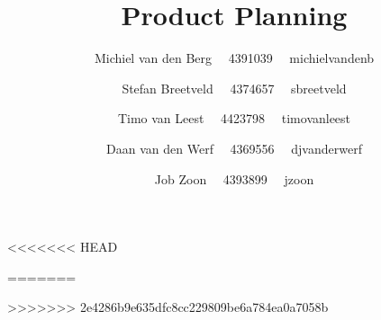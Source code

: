 \documentclass[11pt,a4paper]{article}
\title{Product Planning}
\author{ 	Michiel van den Berg \ \ 4391039 \ \ michielvandenb
		\and Stefan Breetveld \ \ 4374657 \ \ sbreetveld
  		\and Timo van Leest \ \ 4423798 \ \ timovanleest
		\and Daan van den Werf \ \ 4369556 \ \ djvanderwerf
   		\and Job Zoon \ \ 4393899 \ \ jzoon  }
\begin{document}
\maketitle
\newpage
\tableofcontents









<<<<<<< HEAD
\newpage

=======

>>>>>>> 2e4286b9e635dfc8cc229809be6a784ea0a7058b
\end{document}
